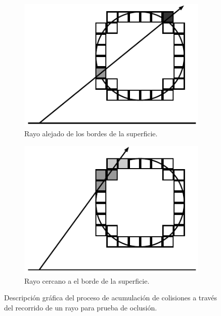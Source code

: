 \begin{figure}[H]
	\centering
	\begin{subfigure}[t]{0.49\textwidth}
		\centering
		\captionsetup{justification=centering}
		\includegraphics[width=\linewidth]{media/shadow_tracer.pdf}
		\caption*{Rayo alejado de los bordes de la superficie.}
	\end{subfigure}%
	\hspace{0.01\textwidth}
	\begin{subfigure}[t]{0.49\textwidth}
		\centering
		\captionsetup{justification=centering}
		\includegraphics[width=\linewidth]{media/shadow_trace_corner.pdf}
		\caption*{Rayo cercano a el borde de la superficie.}
	\end{subfigure}%
	\caption{Descripción gráfica del proceso de acumulación de colisiones a través del recorrido de un rayo para prueba de oclusión.}
	\label{fig:soft_voxel_shadow}
\end{figure}

